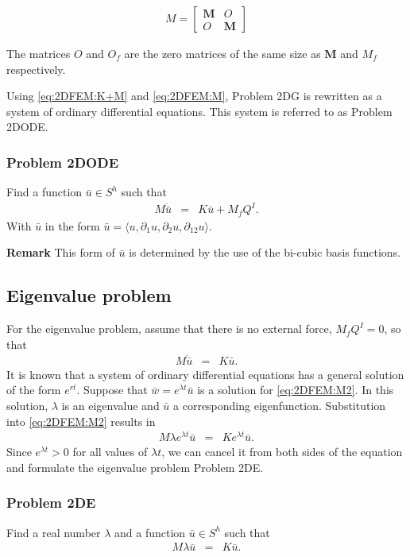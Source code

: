 \begin{eqnarray}
	M = 
	\begin{bmatrix}
		\mathbf{M} & O \\
		O & \mathbf{M}
	\end{bmatrix}\label{eq:2DFEM:M}
\end{eqnarray}

The matrices ${O}$ and ${O_f}$ are the zero matrices of the same size as $\mathbf{M}$ and ${M_f}$ respectively.

Using \eqref{eq:2DFEM:K+M} and \eqref{eq:2DFEM:M}, Problem 2DG is rewritten as a system of ordinary differential equations. This system is referred to as Problem 2DODE.

\subsubsection{Problem 2DODE}
Find a function $\bar{u} \in S^h$ such that
\begin{eqnarray}
	M\ddot{\bar{u}} & = & K\bar{u} + M_{f}Q^I.
\end{eqnarray} With $\bar{u}$ in the form $\bar{u} = \langle u, \partial_1 u, \partial_2 u, \partial_{12} u \rangle$.

\textbf{Remark} This form of $\bar{u}$ is determined by the use of the bi-cubic basis functions.

\subsection{Eigenvalue problem}\label{2dFEM_EP}
For the eigenvalue problem, assume that there is no external force, $M_{f}Q^I = 0$, so that 
\begin{eqnarray}
		M\ddot{\bar{u}} & = & K\bar{u}.\label{eq:2DFEM:M2}
\end{eqnarray}
It is known that a system of ordinary differential equations has a general solution of the form $e^{rt}$. Suppose that $\bar{w} = e^{\lambda t} \bar{u}$ is a solution for \eqref{eq:2DFEM:M2}. In this solution, $\lambda$ is an eigenvalue and $\bar{u}$ a corresponding eigenfunction. Substitution into \eqref{eq:2DFEM:M2} results in
\begin{eqnarray*}
	M\lambda e^{\lambda t}\bar{u} & = & Ke^{\lambda t}\bar{u}.
\end{eqnarray*}
Since $e^{\lambda t} > 0$ for all values of $\lambda t$, we can cancel it from both sides of the equation and formulate the eigenvalue problem Problem 2DE.

\subsubsection{Problem 2DE}
Find a real number $\lambda$ and a function $\bar{u} \in S^h$ such that
\begin{eqnarray}
	M\lambda{\bar{u}} & = & K\bar{u}.
\end{eqnarray}


